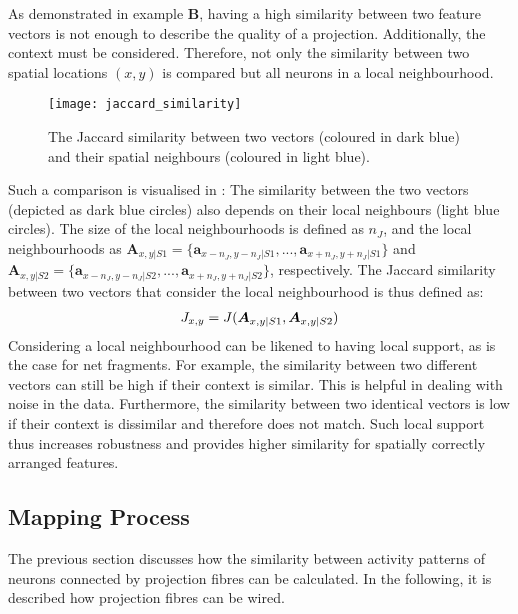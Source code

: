 As demonstrated in  example $\boldsymbol{B}$, having a high similarity between two feature vectors is not enough to describe the quality of a projection.
Additionally, the context must be considered.
Therefore, not only the similarity between two spatial locations $(x,y)$ is compared but all neurons in a local neighbourhood.
\begin{figure}[h]
    \centering
    \texttt{[image: jaccard\_similarity]}
    \caption[Similarity between two vectors and their spatial neighbours]{The Jaccard similarity between two vectors (coloured in dark blue) and their spatial neighbours (coloured in light blue).}
\end{figure}
Such a comparison is visualised in :
The similarity between the two vectors (depicted as dark blue circles) also depends on their local neighbours (light blue circles).
The size of the local neighbourhoods is defined as $n_J$, and the local neighbourhoods as $\boldsymbol{A}_{x,y|S1} = \{ \boldsymbol{a}_{x-n_J,y-n_J|S1}, ..., \boldsymbol{a}_{x+n_J,y+n_J|S1}\}$ and $\boldsymbol{A}_{x,y|S2} = \{ \boldsymbol{a}_{x-n_J,y-n_J|S2}, ..., \boldsymbol{a}_{x+n_J,y+n_J|S2}\}$, respectively.
The Jaccard similarity between two vectors that consider the local neighbourhood is thus defined as:
%
\begin{align}\eqlbl{jaccard2}
	J_{x,y} = J(\boldsymbol{A}_{x,y|S1}, \boldsymbol{A}_{x,y|S2})
\end{align}
%
Considering a local neighbourhood can be likened to having local support, as is the case for net fragments. For example, the similarity between two different vectors can still be high if their context is similar. This is helpful in dealing with noise in the data.
Furthermore, the similarity between two identical vectors is low if their context is dissimilar and therefore does not match.
Such local support thus increases robustness and provides higher similarity for spatially correctly arranged features.


\subsection{Mapping Process}
The previous section discusses how the similarity between activity patterns of neurons connected by projection fibres can be calculated.
In the following, it is described how projection fibres can be wired.

